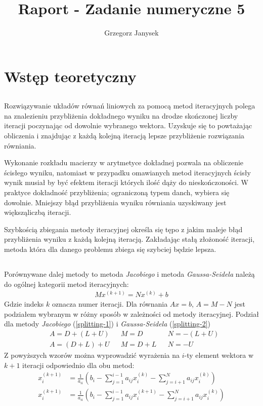 \documentclass[11pt]{extarticle}
\author{Grzegorz Janysek}
\title{Raport - Zadanie numeryczne 5}
\begin{document}
	\maketitle

	\section{Wstęp teoretyczny}

	\subsection{}
	Rozwiązywanie układów równań liniowych za pomocą metod iteracyjnych polega na znalezieniu przybliżenia dokładnego wyniku na drodze skończonej liczby iteracji poczynając od dowolnie wybranego wektora.
	Uzyskuje się to powtażając obliczenia i znajdując z każdą kolejną iteracją lepsze przybliżenie rozwiązania równiania.
	
	Wykonanie rozkładu macierzy w arytmetyce dokładnej pozwala na obliczenie ścisłego wyniku,
	natomiast w przypadku omawianych metod iteracyjnych ścisły wynik musiał by być efektem iteracji których ilość dąży do nieskończoności.
	W praktyce dokładność przybliżenia; ograniczoną typem danch, wybiera się dowolnie.
	Mniejszy błąd przybliżenia wyniku równiania uzyskiwany jest większąliczbą iteracji.

	Szybkością zbiegania metody iteracyjnej określa się tępo z jakim maleje błąd przybliżenia wyniku z każdą kolejną iteracją. Zakładając stałą złożoność iteracji, metoda która dla danego problemu zbiega się szybciej będzie lepsza.
	\subsection{}
	Porównywane dalej metody to metoda \textit{Jacobiego} i metoda \textit{Gaussa-Seidela} należą do ogólnej kategorii metod iteracyjnych:
	\begin{align}
		Mx^{(k+1)} = Nx^{(k)} + b
	\end{align}
	Gdzie indeks \(k\) oznacza numer iteracji. Dla równania \(Ax = b\), \(A = M - N\) jest podziałem wybranym w różny sposób w zależności od metody iteracyjnej. Podział dla metody \textit{Jacobiego} (\ref{splitting-1}) i \textit{Gaussa-Seidela} (\ref{splitting-2})
	\begin{align}
		\label{splitting-1}
		&A = D + (L + U)	&&M=D		&&N = - (L + U) \\
		\label{splitting-2}
		&A = (D + L) + U	&&M=D + L	&&N = - U
	\end{align}
	Z powyższych wzorów można wyprowadzić wyrażenia na \(i\)-ty element wektora w \(k+1\) iteracji odpowiednio dla obu metod:
	\begin{align}
		x_i^{(k+1)} &= \frac{1}{a_{ii}} \left( b_i - \sum_{j=1}^{i-1} a_{ij} x_{i}^{(k)} - \sum_{j=i+1}^{N} a_{ij} x_{i}^{(k)} \right) \\
		x_i^{(k+1)} &= \frac{1}{a_{ii}} \left( b_i - \sum_{j=1}^{i-1} a_{ij} x_{i}^{(k+1)} - \sum_{j=i+1}^{N} a_{ij} x_{i}^{(k)} \right)
	\end{align}
\end{document}
